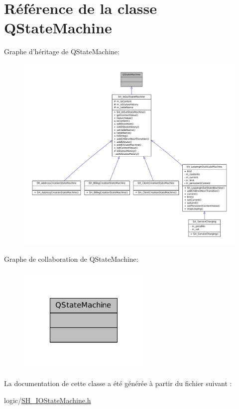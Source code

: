 \hypertarget{classQStateMachine}{\section{Référence de la classe Q\-State\-Machine}
\label{classQStateMachine}
}


Graphe d'héritage de Q\-State\-Machine\-:
\nopagebreak
\begin{figure}[H]
\begin{center}
\leavevmode
\includegraphics[width=350pt]{classQStateMachine__inherit__graph}
\end{center}
\end{figure}


Graphe de collaboration de Q\-State\-Machine\-:
\nopagebreak
\begin{figure}[H]
\begin{center}
\leavevmode
\includegraphics[width=180pt]{classQStateMachine__coll__graph}
\end{center}
\end{figure}


La documentation de cette classe a été générée à partir du fichier suivant \-:\begin{DoxyCompactItemize}
\item 
logic/\hyperlink{SH__IOStateMachine_8h}{S\-H\-\_\-\-I\-O\-State\-Machine.\-h}\end{DoxyCompactItemize}
